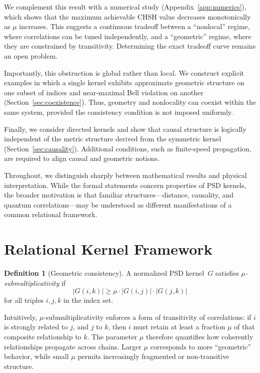 \documentclass[11pt,a4paper]{article}
\theoremstyle{definition}
\newtheorem{definition}[theorem]{Definition}
\theoremstyle{remark}
\begin{document}
We complement this result with a numerical study (Appendix~\ref{app:numerics}), which shows that the maximum achievable CHSH value decreases monotonically as $\mu$ increases. This suggests a continuous tradeoff between a ``nonlocal'' regime, where correlations can be tuned independently, and a ``geometric'' regime, where they are constrained by transitivity. Determining the exact tradeoff curve remains an open problem.

Importantly, this obstruction is global rather than local. We construct explicit examples in which a single kernel exhibits approximate geometric structure on one subset of indices and near-maximal Bell violation on another (Section~\ref{sec:coexistence}). Thus, geometry and nonlocality can coexist within the same system, provided the consistency condition is not imposed uniformly.

Finally, we consider directed kernels and show that causal structure is logically independent of the metric structure derived from the symmetric kernel (Section~\ref{sec:causality}). Additional conditions, such as finite-speed propagation, are required to align causal and geometric notions.

Throughout, we distinguish sharply between mathematical results and physical interpretation. While the formal statements concern properties of PSD kernels, the broader motivation is that familiar structures---distance, causality, and quantum correlations---may be understood as different manifestations of a common relational framework.


\section{Relational Kernel Framework}\label{sec:framework}

\begin{definition}[Geometric consistency]
A normalized PSD kernel~$G$ satisfies \emph{$\mu$-submultiplicativity} if
\[
|G(i,k)| \ge \mu \cdot |G(i,j)| \cdot |G(j,k)|
\]
for all triples $i,j,k$ in the index set.
\end{definition}

Intuitively, $\mu$-submultiplicativity enforces a form of transitivity of correlations: if $i$ is strongly related to $j$, and $j$ to $k$, then $i$ must retain at least a fraction $\mu$ of that composite relationship to $k$. The parameter $\mu$ therefore quantifies how coherently relationships propagate across chains. Larger $\mu$ corresponds to more ``geometric'' behavior, while small $\mu$ permits increasingly fragmented or non-transitive structure.
\end{document}
